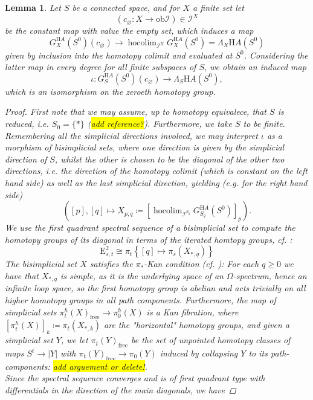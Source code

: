 \documentclass[10pt, a4paper, UKenglish]{article}
\numberwithin{equation}{section}
\newcommand{\cI}{\mathcal{I}}
\newcommand{\defas}{\coloneqq}  %
\newcommand{\abs}[1]{\left\vert#1\right\vert}	%
\newcommand{\ob}{\mathrm{ob}}
\newcommand{\comm}[1]{\colorbox{yellow}{#1}}
\renewcommand{\H}{\mathrm{H}}
\theoremstyle{plain}
\newtheorem{lem}[equation]{Lemma}
\theoremstyle{definition}
\renewcommand{\to}{\longrightarrow}
\renewcommand{\mapsto}{\longmapsto}
\DeclareMathOperator*{\hocolim}{hocolim}
\begin{document}
\begin{lem}\label{lem_pi_0_loday_HA_A}
Let $S$ be a connected space, and for $X$ a finite set let
	\[(c_\varnothing: X \to \ob \cI) \in \cI^X\]
be the constant map with value the empty set, which induces a map
\[
	G_X^{\H A}(S^0)(c_\varnothing) \to \hocolim_{\cI^X} G_X^{\H A}(S^0) = %
	\Lambda_X \H A (S^0)
\]
given by inclusion into the homotopy colimit and evaluated at $S^0$. Considering the latter map in every degree for all finite subspaces of $S$, we obtain an induced map
  \[	\iota: G^{\H A}_S (S^0) (c_\varnothing) \to \Lambda_S \H A (S^0), \]
which is an isomorphism on the zeroeth homotopy group.
\begin{proof}
First note that we may assume, up to homotopy equivalece, that $S$ is reduced, i.e. $S_0 = \{\ast\}$ (\comm{add reference?}). Furthermore, we take $S$ to be finite. Remembering all the simplicial directions involved, we may interpret $\iota$ as a morphism of bisimplicial sets, where one direction is given by the simplicial direction of $S$, whilst the other is chosen to be the diagonal of the other two directions, i.e. the direction of the homotopy colimit (which is constant on the left hand side) as well as the last simplicial direction, yielding (e.g. for the right hand side) %
	\[ \left( [p],[q] \longmapsto X_{p,q} \defas [\hocolim_{\cI^{S_q}} G^{\H A}_{S_q} (S^0)]_p \right) . \]
We use the first quadrant spectral sequence of a bisimplicial set to compute the homotopy groups of its diagonal in terms of the iterated homtopy groups, cf. \cite[Thm. B5]{bousfield1978homotopy}:
	\[	\mathrm{E}^2_{s,t} %
	\cong \pi_t \left\{ [q] \mapsto \pi_s(X_{\ast,q}) \right\}	\]
The bisimplicial set $X$ satisfies the $\pi_*$-Kan condition (cf. \cite[B.3.1]{bousfield1978homotopy}): For each $q \geq 0$ we have that $X_{\ast, q}$ is simple, as it is the underlying space of an $\Omega$-spectrum, hence an infinite loop space, so the first homotopy group is abelian and acts trivially on all higher homotopy groups in all path components. Furthermore, the map of simplicial sets $\pi_t^h(X)_{\mathrm{free}} \to \pi_0^h (X)$ is a Kan fibration, where $[\pi_t^h(X)]_k \defas \pi_t(X_{\ast,k})$ are the "horizontal" homotopy groups, and given a simplicial set $Y$, we let $\pi_t (Y)_\mathrm{free}$ be the set of unpointed homotopy classes of maps $S^t \to \abs{Y}$ with $\pi_t(Y)_\mathrm{free} \to \pi_0(Y)$ induced by collapsing $Y$ to its path-components: \comm{add arguement or delete!}.\\
Since the spectral sequence converges and is of first quadrant type with differentials in the direction of the main diagonals, we have

\end{proof}
\end{lem}
\end{document}
